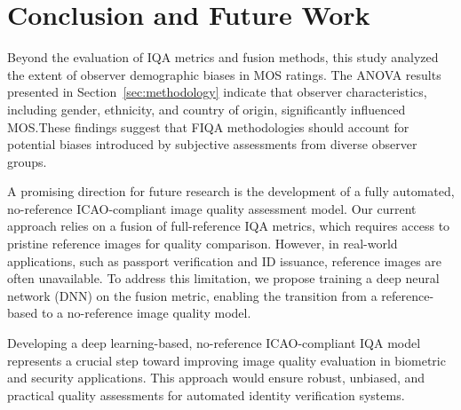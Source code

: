 \section{Conclusion and Future Work}

Beyond the evaluation of IQA metrics and fusion methods, this study analyzed the extent of observer demographic biases in MOS ratings. The ANOVA results presented in Section~\ref{sec:methodology} indicate that observer characteristics, including gender, ethnicity, and country of origin, significantly influenced MOS.\@ These findings suggest that FIQA methodologies should account for potential biases introduced by subjective assessments from diverse observer groups.

A promising direction for future research is the development of a fully automated, no-reference ICAO-compliant image quality assessment model. Our current approach relies on a fusion of full-reference IQA metrics, which requires access to pristine reference images for quality comparison. However, in real-world applications, such as passport verification and ID issuance, reference images are often unavailable. To address this limitation, we propose training a deep neural network (DNN) on the fusion metric, enabling the transition from a reference-based to a no-reference image quality model.

Developing a deep learning-based, no-reference ICAO-compliant IQA model represents a crucial step toward improving image quality evaluation in biometric and security applications. This approach would ensure robust, unbiased, and practical quality assessments for automated identity verification systems.